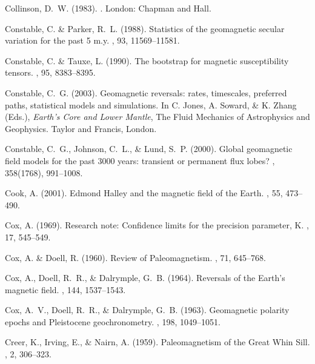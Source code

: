 \documentclass[11pt]{book}
\begin{document}
\begin{thebibliography}{}
Collinson, D.~W. (1983).
.
\newblock London: Chapman and Hall.

Constable, C. \& Parker, R.~L. (1988).
\newblock Statistics of the geomagnetic secular variation for the past 5 m.y.
, 93, 11569--11581.

Constable, C. \& Tauxe, L. (1990).
\newblock The bootstrap for magnetic susceptibility tensors.
, 95, 8383--8395.

Constable, C.~G. (2003).
\newblock Geomagnetic reversals: rates, timescales, preferred paths,
  statistical models and simulations.
\newblock In C. Jones, A. Soward, \& K. Zhang (Eds.), {\em Earth's Core and
  Lower Mantle}, The Fluid Mechanics of Astrophysics and Geophysics. Taylor and
  Francis, London.

Constable, C.~G., Johnson, C.~L., \& Lund, S.~P. (2000).
\newblock Global geomagnetic field models for the past 3000 years: transient or
  permanent flux lobes?
, 358(1768), 991--1008.

Cook, A. (2001).
\newblock Edmond Halley and the magnetic field of the Earth.
, 55, 473--490.

Cox, A. (1969).
\newblock Research note: Confidence limits for the precision parameter, K.
, 17, 545--549.

Cox, A. \& Doell, R. (1960).
\newblock Review of Paleomagnetism.
, 71, 645--768.

Cox, A., Doell, R.~R., \& Dalrymple, G.~B. (1964).
\newblock Reversals of the Earth's magnetic field.
, 144, 1537--1543.

Cox, A.~V., Doell, R.~R., \& Dalrymple, G.~B. (1963).
\newblock Geomagnetic polarity epochs and Pleistocene geochronometry.
, 198, 1049--1051.

Creer, K., Irving, E., \& Nairn, A. (1959).
\newblock Paleomagnetism of the Great Whin Sill.
, 2, 306--323.


\end{thebibliography}
\end{document}
